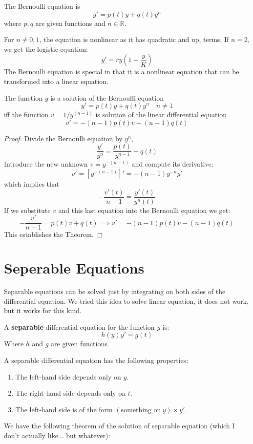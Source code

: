 \begin{definition}
    The Bernoulli equation is $$y'=p(t)y+q(t)y^{n}$$
    where $p,q$ are given functions and $n\in \mathbb{R}$. 
\end{definition}

For $n\neq 0,1$, the equation is nonlinear as it has quadratic and up, terms. If $n=2$, we get the logistic equation: $$y'=ry\left( 1-\frac{y}{K} \right)$$
The Bernoulli equation is special in that it is a nonlinear equation that can be transformed into a linear equation. 

\begin{theorem}
    The function $y$ is a solution of the Bernoulli equation $$y'=p(t)y+q(t)y^{n}\quad n\neq 1$$
iff the function $v=1/y^{(n-1)}$ is solution of the linear differential equation $$v'=-(n-1)p(t)v-(n-1)q(t)$$
\end{theorem}
\begin{proof}
    Divide the Bernoulli equation by $y^{n}$, 
$$\frac{y'}{y^{n}}=\frac{p(t)}{y^{n-1}}+q(t)$$
Introduce the new unknown $v=y^{-(n-1)}$ and compute its derivative: 
$$v'=[y^{-(n-1)}]'=-(n-1)y^{-n}y'$$
which implies that $$-\frac{v'(t)}{n-1}=\frac{y'(t)}{y^{n}(t)}$$
If we substitute $v$ and this last equation into the Bernoulli equation we get: 
$$-\frac{v'}{n-1}=p(t)v+q(t)\implies v'=-(n-1)p(t)v-(n-1)q(t)$$
This establishes the Theorem.
\end{proof}
\section{Seperable Equations}
Separable equations can be solved just by integrating on both sides of the differential equation. We tried this idea to solve linear equation, it does not work, but it works for this kind. 
\begin{definition}
    A \textbf{separable} differential equation for the function $y$ is: $$h(y)y'=g(t)$$
Where $h$ and $g$ are given functions. 
\end{definition}
A separable differential equation has the following properties: 
\begin{enumerate}
    \item The left-hand side depends only on $y$. 
    \item The right-hand side depends only on $t$. 
    \item The left-hand side is of the form $(\text{something on}\: y)\times y'$. 
\end{enumerate}
We have the following theorem of the solution of separable equation (which I don't actually like... but whatever): 

